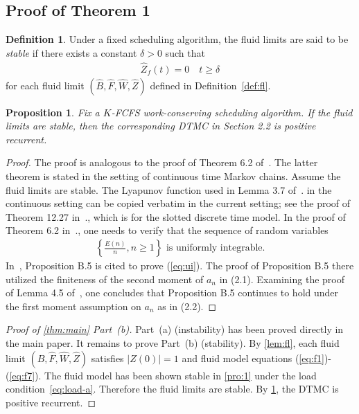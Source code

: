 \documentclass[11pt]{article}
\theoremstyle{plain}
\newtheorem{proposition}[theorem]{Proposition}
\theoremstyle{definition}
\newtheorem{definition}[theorem]{Definition}
\theoremstyle{remark}
\providecommand{\abs}[1]{\lvert#1\rvert}
\begin{document}
\subsection{Proof of Theorem 1}
\label{sec:stability}
\begin{definition}
  Under a fixed scheduling algorithm, the fluid limits are said to be
  \textit{stable} if there exists a constant $\delta>0$ such that
  \begin{align}
    \label{eq:flstable}
    \hat Z_f(t) =0 \quad t\ge \delta
  \end{align}
  for each fluid limit $(\hat B, \hat F, \hat W, \hat Z)$ defined in Definition~\ref{def:fl}.
\end{definition}


\begin{proposition}\label{pro:2}
  Fix a $K$-FCFS work-conserving scheduling algorithm.
  If the fluid limits are stable, then the corresponding DTMC in Section 2.2 is positive recurrent.
\end{proposition}
\begin{proof}
  The proof is analogous to the proof of Theorem 6.2 of~\citep{dai2020processing}.  The latter
  theorem is stated in the setting of continuous time Markov
  chains. Assume the fluid limits are stable.  The Lyapunov function
  used in Lemma 3.7 of~\citep{dai2020processing}. in the continuous setting can be copied
  verbatim in the current setting;  see the proof of 
   Theorem 12.27 in~\citep{dai2020processing}., which is for the slotted discrete time model.
  In the proof of Theorem 6.2 in~\citep{dai2020processing}.,
  one needs to verify that 
  the sequence of random variables
  \begin{align}\label{eq:ui}
\left\{ \frac{E(n)}{n}, n\ge 1\right\} \text{   is uniformly integrable.}
  \end{align}
  In~\citep{dai2020processing}, Proposition B.5 is cited to prove (\ref{eq:ui}). The proof of
  Proposition B.5 there utilized the finiteness of the second moment of
  $a_n$ in (2.1).  Examining the proof of
  Lemma 4.5 of~\citep{dai1995positive}, one concludes that  Proposition B.5 continues to
  hold under the first moment assumption on $a_n$ as in (2.2).
\end{proof}

\begin{proof}[Proof of \cref{thm:main} Part~(b)]
  Part~(a) (instability) has been proved directly in the main paper. It remains to prove Part~(b) (stability).
  By \cref{lem:fl}, each fluid limit
  $(\hat B, \hat F, \hat W, \hat Z)$ satisfies $\abs{Z(0)}=1$ and
  fluid model equations (\ref{eq:f1})-(\ref{eq:f7}).
  The fluid model has been shown stable in \cref{pro:1}
  under the load condition~\cref{eq:load-a}. Therefore the fluid limits are stable. By \cref{pro:2}, the DTMC is positive recurrent.
\end{proof}
\end{document}
